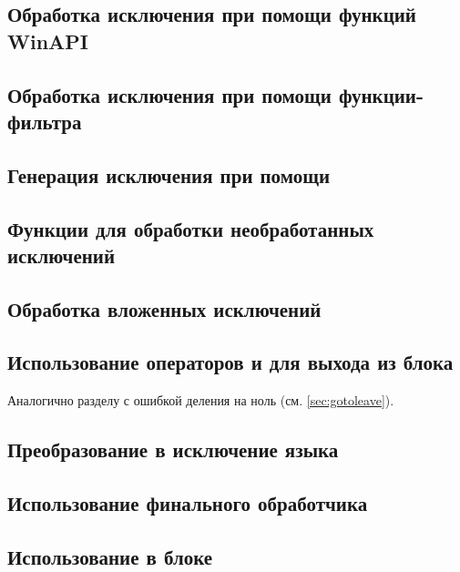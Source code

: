 \subsection{Обработка исключения при помощи функций WinAPI}


\subsection{Обработка исключения при помощи функции-фильтра}


\subsection{Генерация исключения при помощи }


\subsection{Функции для обработки необработанных исключений}


\subsection{Обработка вложенных исключений}


\subsection{Использование операторов  и  для выхода из блока }

Аналогично разделу с ошибкой деления на ноль (см. \ref{sec:gotoleave}).

\subsection{Преобразование в исключение языка }

\subsection{Использование финального обработчика }

\subsection{Использование  в блоке }

